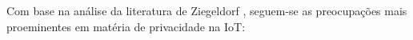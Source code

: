 \documentclass[conference]{IEEEtran}
\begin{document}

Com base na análise da literatura de Ziegeldorf \cite{ziegeldorf2014privacy},
seguem-se as preocupações mais proeminentes em matéria de privacidade na
IoT:

\end{document}

